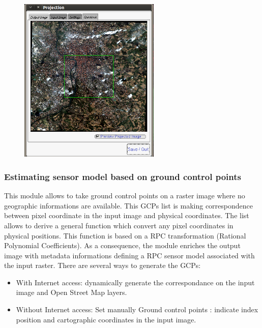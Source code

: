\begin{figure}
  \center
  \includegraphics[width=0.6\textwidth]{../Art/MonteverdiImages/monteverdi_ortho_extent.png}
  \label{fig:ortho}
\end{figure}


\subsubsection{Estimating sensor model based on ground control points}
This module allows to take ground control points on a raster image
where no geographic informations are available.  This GCPs list is
making correspondence between pixel coordinate in the input image and
physical coordinates. The list allows to derive a general function
which convert any pixel coordinates in physical positions. This
function is based on a RPC transformation (Rational Polynomial
Coefficients). As a consequence, the module enriches the output image
with metadata informations defining a RPC sensor model associated with
the input raster.  There are several ways to generate the GCPs:

\begin{itemize}
\item With Internet access: dynamically generate the correspondance on
  the input image and Open Street Map layers.
\item Without Internet access: Set manually Ground control points :
  indicate index position and cartographic coordinates in the input
  image.
\end{itemize}

